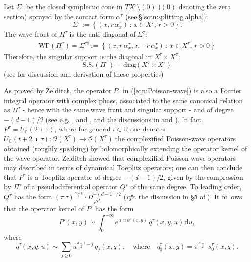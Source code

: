 \documentclass[12pt,a4paper]{article}
\theoremstyle{plain}
\theoremstyle{definition}
\begin{document}
Let $\Sigma^\tau$ be the closed symplectic cone in $TX^\tau\setminus (0)$
($(0)$ denoting the zero section)
sprayed by the contact form $\alpha^\tau$ 
(see \S \ref{sctn:splitting alpha}):
$$
\Sigma^\tau:=\left\{\left(x,r\,\alpha_x^\tau\right)\,:\,x\in X^\tau,
\,r>0\right\}.
$$
The wave front of $\Pi^\tau$ is the anti-diagonal of $\Sigma^\tau$:
\begin{eqnarray}
\mathrm{WF}(\Pi^\tau)=
{\Sigma^\tau}^\sharp:=\left\{\left(x,r\,\alpha_x^\tau,x,-r\,\alpha_x^\tau
\right)\,:\,x\in X^\tau,\,r>0\right\}
\end{eqnarray}
%
Therefore, the singular support is the diagonal in $X^\tau\times X^\tau$:
$$
\mathrm{S.S.}(\Pi^\tau)=\mathrm{diag}(X^\tau\times X^\tau)
$$
(see \cite{bs}
for discussion and derivation of these properties)



As proved by Zelditch, the operator $P^\tau$
in (\ref{eqn:Poisson-wave})
is also a Fourier integral operator with complex
phase, associated to the same canonical relation as $\Pi^\tau$ - hence with the same wave front and singular support - 
and of
degree $-(d-1)/2$ (see e.g. \cite{z12}, \cite{z14} and \cite{z20}, and the discussions in \cite{cr1} and \cite{cr2}).
In fact $P^\tau=U_\mathbb{C}(2\,\imath\,\tau)$,
where for general $t\in \mathbb{R}$ one denotes
$ U_\mathbb{C}(t+2\,\imath\,\tau):\mathcal{O}(X^\tau)
\rightarrow \mathcal{O}(X^\tau)$ the complexified
Poisson-wave operators obtained (roughly speaking) by
holomorphically extending the operator kernel of the
wave operator. 
Zelditch showed that complexified 
Poisson-wave operators may described
in terms of dynamical Toeplitz operators;
one can then conclude that
$P^\tau$ is a Toeplitz operator of degree
$-(d-1)/2$, given by the compression 
by $\Pi^\tau$ of a pseudodifferential
operator $Q^\tau$ of the same degree. 
To leading order, $Q^\tau$
has the form $(\pi\,\tau)^{\frac{d-1}{2}} \cdot D_{\sqrt{\rho}}^{-(d-1)/2}$
(\textit{cfr.} the discussion in \S 5 of \cite{gp24}).
It follows that
the operator kernel of $P^\tau$ has the form
\begin{equation}
\label{eqn:Ptau ker}
P^\tau(x,y)\sim \int_0^{+\infty}e^{\imath\,u\,\psi^\tau(x,y)}\,
q^\tau(x,y,u)\,\mathrm{d}u,
\end{equation}
where 
\begin{equation}
\label{eqn:asy exp Ptau}
q^\tau(x,y,u)\sim \sum_{j\ge 0}u^{\frac{d-1}{2}-j}\,q_j(x,y),
\quad\text{where}\quad
q^\tau_0(x,y)=\pi^{\frac{d-1}{2}}\,s^\tau_0(x,y).
\end{equation}
%
%
\end{document}
